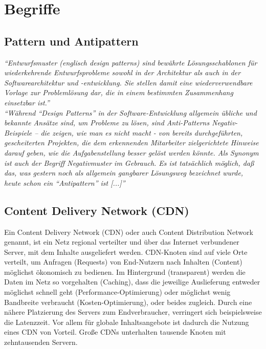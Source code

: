 
\section{Begriffe}
\label{sec:begriffe}
	\subsection{Pattern und Antipattern} %
	\label{sub:pattern_und_anti_pattern}
		\textit{"`Entwurfsmuster (englisch design patterns) sind bewährte Lösungsschablonen für wiederkehrende Entwurfsprobleme sowohl in der Architektur als auch in der Softwarearchitektur und -entwicklung. Sie stellen damit eine wiederverwendbare Vorlage zur Problemlösung dar, die in einem bestimmten Zusammenhang einsetzbar ist."'} \autocite{pattern15}
		\\

		\textit{"`Während "`Design Patterns"' in der Software-Entwicklung allgemein übliche und bekannte Ansätze sind, um Probleme zu lösen, sind Anti-Patterns Negativ-Beispiele – die zeigen, wie man es nicht macht - von bereits durchgeführten, gescheiterten Projekten, die dem erkennenden Mitarbeiter zielgerichtete Hinweise darauf geben, wie die Aufgabenstellung besser gelöst werden könnte. Als Synonym ist auch der Begriff Negativmuster im Gebrauch. Es ist tatsächlich möglich, daß das, was gestern noch als allgemein gangbarer Lösungsweg bezeichnet wurde, heute schon ein "`Antipattern"' ist [...]"'} \autocite{Stepken06}



	\subsection{Content Delivery Network (CDN)} %
	\label{sub:content_delivery_network}
		Ein Content Delivery Network (CDN) oder auch Content Distribution Network genannt, ist ein Netz regional verteilter und über das Internet verbundener Server, mit dem Inhalte ausgeliefert werden. CDN-Knoten sind auf viele Orte verteilt, um Anfragen (Requests) von End-Nutzern nach Inhalten (Content) möglichst ökonomisch zu bedienen. Im Hintergrund (transparent) werden die Daten im Netz so vorgehalten (Caching), dass die jeweilige Auslieferung entweder möglichst schnell geht (Performance-Optimierung) oder möglichst wenig Bandbreite verbraucht (Kosten-Optimierung), oder beides zugleich.	Durch eine nähere Platzierung des Servers zum Endverbraucher, verringert sich beispielsweise die Latenzzeit. Vor allem für globale Inhaltsangebote ist dadurch die Nutzung eines CDN von Vorteil. Große CDNs unterhalten tausende Knoten mit zehntausenden Servern.\autocite[vgl.]{wikipediaCDN}

